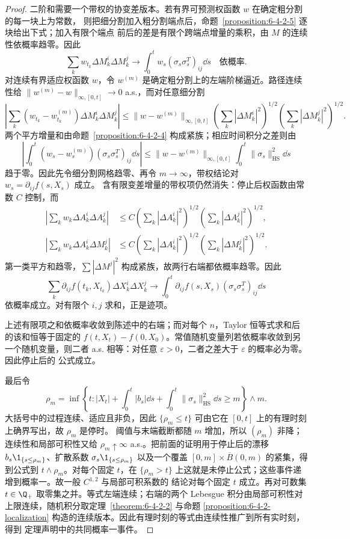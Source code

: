 \begin{proof}
二阶和需要一个带权的协变差版本。若有界可预测权函数 $w$ 在确定粗分割的每一块上为常数，
则把细分割加入粗分割端点后，命题~\ref{proposition:6-4-2-5} 逐块给出下式；加入有限个端点
前后的差是有限个跨端点增量的乘积，由 $M$ 的连续性依概率趋零。因此
\[
 \sum_k w_{t_k}\Delta M_k^i\Delta M_k^j
 \longrightarrow
 \int_0^t w_s(\sigma_s\sigma_s^T)_{ij}\dd s
 \quad\text{依概率}.
\]
对连续有界适应权函数 $w$，令 $w^{(m)}$ 是确定粗分割上的左端阶梯逼近。路径连续性给
$\|w^{(m)}-w\|_{\infty,[0,t]}\to0$ a.s.，而对任意细分割
\[
 \left|\sum_k(w_{t_k}-w^{(m)}_{t_k})\Delta M_k^i\Delta M_k^j\right|
 \le \|w-w^{(m)}\|_{\infty,[0,t]}
 \left(\sum_k|\Delta M_k^i|^2\right)^{1/2}
 \left(\sum_k|\Delta M_k^j|^2\right)^{1/2}.
\]
两个平方增量和由命题~\ref{proposition:6-4-2-4} 构成紧族；相应时间积分之差则由
\[
 \left|\int_0^t(w_s-w_s^{(m)})(\sigma_s\sigma_s^T)_{ij}\dd s\right|
 \le \|w-w^{(m)}\|_{\infty,[0,t]}
      \int_0^t\|\sigma_s\|_{\mathrm{HS}}^2\dd s
\]
趋于零。因此先令细分割网格趋零、再令 $m\to\infty$，带权结论对
$w_s=\partial_{ij}f(s,X_s)$ 成立。
含有限变差增量的带权项仍然消失：停止后权函数由常数 $C$ 控制，而
\begin{align*}
 \left|\sum_kw_k\Delta A_k^i\Delta A_k^j\right|
 &\le C\left(\sum_k|\Delta A_k^i|^2\right)^{1/2}
          \left(\sum_k|\Delta A_k^j|^2\right)^{1/2},\\
 \left|\sum_kw_k\Delta A_k^i\Delta M_k^j\right|
 &\le C\left(\sum_k|\Delta A_k^i|^2\right)^{1/2}
          \left(\sum_k|\Delta M_k^j|^2\right)^{1/2}.
\end{align*}
第一类平方和趋零，$\sum|\Delta M^j|^2$ 构成紧族，故两行右端都依概率趋零。因此
\[
 \sum_k\partial_{ij}f(t_k,X_{t_k})\Delta X_k^i\Delta X_k^j
 \longrightarrow
 \int_0^t\partial_{ij}f(s,X_s)(\sigma_s\sigma_s^T)_{ij}\dd s
\]
依概率成立。对有限个 $i,j$ 求和，正是迹项。

上述有限项之和依概率收敛到陈述中的右端；而对每个 $n$，Taylor 恒等式求和后的该和恒等于固定的
$f(t,X_t)-f(0,X_0)$。常值随机变量列若依概率收敛到另一个随机变量，则二者 a.s. 相等：对任意
$\varepsilon>0$，二者之差大于 $\varepsilon$ 的概率必为零。因此停止后的 \Ito{} 公式成立。

最后令
\[
 \rho_m=\inf\left\{t:|X_t|+\int_0^t|b_s|\dd s
 +\int_0^t\|\sigma_s\|_{\mathrm{HS}}^2\dd s\ge m\right\}\wedge m.
\]
大括号中的过程连续、适应且非负，因此
$\{\rho_m\le t\}$ 可由它在 $[0,t]$ 上的有理时刻上确界写出，故 $\rho_m$ 是停时。
阈值与末端截断都随 $m$ 增加，所以 $(\rho_m)$ 非降；连续性和局部可积性又给
$\rho_m\uparrow\infty$ a.s.。把前面的证明用于停止后的漂移
$b_s\1_{\{s\le\rho_m\}}$、扩散系数
$\sigma_s\1_{\{s\le\rho_m\}}$ 以及一个覆盖
$[0,m]\times\overline B(0,m)$ 的紧集，得到公式到 $t\wedge\rho_m$。对每个固定 $t$，在
$\{\rho_m>t\}$ 上这就是未停止公式；这些事件递增到概率一。故一般 $C^{1,2}$ 与局部可积系数的
结论对每个固定 $t$ 成立。再对可数集 $t\in\Q_+$ 取零集之并。等式左端连续；右端的两个
Lebesgue 积分由局部可积性对上限连续，随机积分取定理~\ref{theorem:6-4-2-2} 与命题
\ref{proposition:6-4-2-localization} 构造的连续版本。因此有理时刻的等式由连续性推广到所有实时刻，得到
定理声明中的共同概率一事件。
\end{proof}

